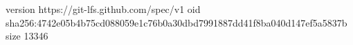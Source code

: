 version https://git-lfs.github.com/spec/v1
oid sha256:4742e05b4b75cd088059e1c76b0a30dbd7991887dd41f8ba040d147ef5a5837b
size 13346
